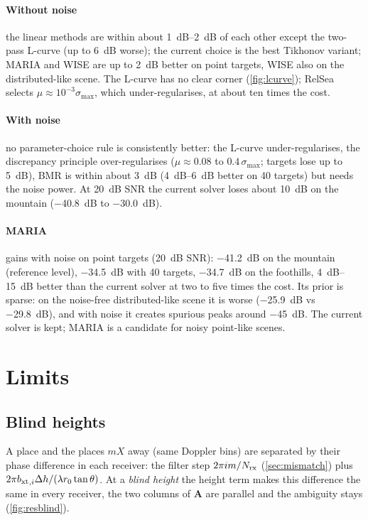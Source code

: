 \paragraph{Without noise} the linear methods are within about \SIrange{1}{2}{dB} of each other except the two-pass L-curve (up
to \SI{6}{dB} worse); the current choice is the best Tikhonov variant; MARIA and WISE are up to \SI{2}{dB} better on point
targets, WISE also on the distributed-like scene. The L-curve has no clear corner (\cref{fig:lcurve}); RelSea selects
$\mu\approx10^{-3}\sigma_{\max}$, which under-regularises, at about ten times the cost.

\paragraph{With noise} no parameter-choice rule is consistently better: the L-curve under-regularises, the discrepancy principle
over-regularises ($\mu\approx0.08$ to $0.4\,\sigma_{\max}$; targets lose up to \SI{5}{dB}), BMR is within about \SI{3}{dB}
(\SIrange{4}{6}{dB} better on 40 targets) but needs the noise power. At \SI{20}{dB} SNR the current solver loses about
\SI{10}{dB} on the mountain (\SI{-40.8}{dB} to \SI{-30.0}{dB}).

\paragraph{MARIA} gains with noise on point targets (\SI{20}{dB} SNR): \SI{-41.2}{dB} on the mountain (reference level),
\SI{-34.5}{dB} with 40 targets, \SI{-34.7}{dB} on the foothills, \SIrange{4}{15}{dB} better than the current solver at two to five
times the cost. Its prior is sparse: on the noise-free distributed-like scene it is worse (\SI{-25.9}{dB} vs \SI{-29.8}{dB}),
and with noise it creates spurious peaks around \SI{-45}{dB}. The current solver is kept; MARIA is a candidate for noisy
point-like scenes.

\section{Limits}\label{sec:limits}

\subsection{Blind heights}\label{sec:blind}

A place and the places $mX$ away (same Doppler bins) are separated by their phase difference in each receiver: the filter step
$2\pi im/{N_{\mathrm{rx}}}$ (\cref{sec:mismatch}) plus $2\pi{b_{\mathrm{xt}}}_{,i}\Delta h/(\lambda r_0\tan\theta)$. At a \emph{blind height} the height
term makes this difference the same in every receiver, the two columns of $\mathbf A$ are parallel and the ambiguity stays
(\cref{fig:resblind}).

